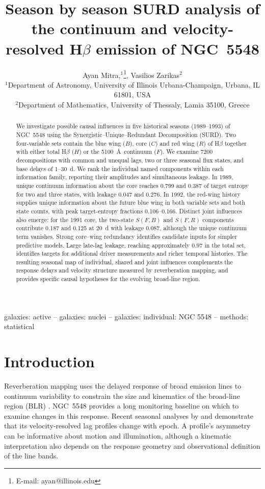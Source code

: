 \documentclass[fleqn,usenatbib]{mnras}
\title[SURD analysis of NGC 5548]{Season by season SURD analysis of the continuum and velocity-resolved H$\beta$ emission of NGC~5548}
\author[A. Mitra \& V. Zarikas]{
Ayan Mitra,$^{1}$\thanks{E-mail: ayan@illinois.edu},
Vasilios Zarikas$^{2}$\\
$^{1}$Department of Astronomy, University of Illinois Urbana-Champaign, Urbana, IL 61801, USA\\
$^{2}$Department of Mathematics, University of Thessaly, Lamia 35100, Greece
}
\date{}
\begin{document}
\label{firstpage}
\pagerange{\pageref{firstpage}--\pageref{LastPage}}
\maketitle
\begin{abstract}
We investigate possible causal influences in five historical seasons (1989--1993) of NGC~5548 using the Synergistic--Unique--Redundant Decomposition (SURD). Two four-variable sets contain the blue wing ($B$), core ($C$) and red wing ($R$) of H$\beta$ together with either total H$\beta$ ($H$) or the 5100~\AA\ continuum ($F$). We examine 7200 decompositions with common and unequal lags, two or three seasonal flux states, and base delays of 1--30~d. We rank the individual named components within each information family, reporting their amplitudes and simultaneous leakage. In 1989, unique continuum information about the core reaches 0.799 and 0.387 of target entropy for two and three states, with leakage 0.047 and 0.276. In 1992, the red-wing history supplies unique information about the future blue wing in both variable sets and both state counts, with peak target-entropy fractions 0.106--0.166. Distinct joint influences also emerge: for the 1991 core, the two-state $S(F,B)$ and $S(F,R)$ components contribute 0.187 and 0.125 at 20~d with leakage 0.087, although the unique continuum term vanishes. Strong core--wing redundancy identifies candidate inputs for simpler predictive models. Large late-lag leakage, reaching approximately 0.97 in the total set, identifies targets for additional driver measurements and richer temporal histories. The resulting seasonal map of individual, shared and joint influences complements the response delays and velocity structure measured by reverberation mapping, and provides specific causal hypotheses for the evolving broad-line region.
\end{abstract}
\begin{keywords}
galaxies: active -- galaxies: nuclei -- galaxies: individual: NGC 5548 -- methods: statistical
\end{keywords}

\section{Introduction}
Reverberation mapping uses the delayed response of broad emission lines to continuum variability to constrain the size and kinematics of the broad-line region (BLR) \citep{Peterson2004ApJ}. NGC~5548 provides a long monitoring baseline on which to examine changes in this response. Recent seasonal analyses by \citet{Lu2022} and \citet{Xi2025} demonstrate that its velocity-resolved lag profiles change with epoch. A profile's asymmetry can be informative about motion and illumination, although a kinematic interpretation also depends on the response geometry and observational definition of the line bands.
\end{document}
